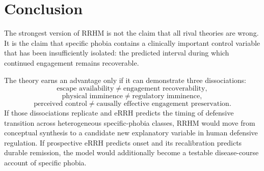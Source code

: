 \documentclass[10pt]{article}
\begin{document}
\section{Conclusion}
The strongest version of RRHM is not the claim that all rival theories are wrong. It is the claim that specific phobia contains a clinically important control variable that has been insufficiently isolated: the predicted interval during which continued engagement remains recoverable.

The theory earns an advantage only if it can demonstrate three dissociations:
\[
\text{escape availability}\neq\text{engagement recoverability},
\]
\[
\text{physical imminence}\neq\text{regulatory imminence},
\]
\[
\text{perceived control}\neq\text{causally effective engagement preservation}.
\]
If those dissociations replicate and eRRH predicts the timing of defensive transition across heterogeneous specific-phobia classes, RRHM would move from conceptual synthesis to a candidate new explanatory variable in human defensive regulation. If prospective eRRH predicts onset and its recalibration predicts durable remission, the model would additionally become a testable disease-course account of specific phobia.
\end{document}
